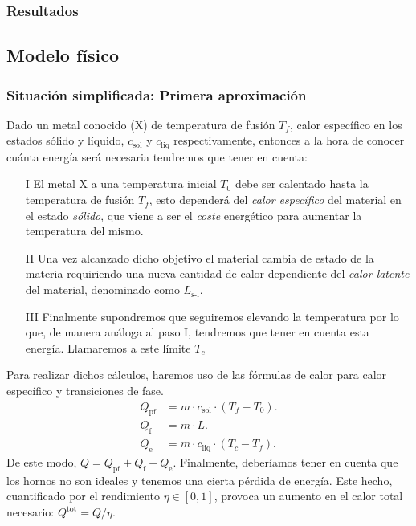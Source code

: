 \subsubsection{Resultados}
%
%
%

%
\subsection{Modelo físico}
%
%
\subsubsection{Situación simplificada: Primera aproximación} \label{PrimeraAproximacion}
%
%
%
Dado un metal conocido (X) de temperatura de fusión $T_f$, calor específico en los estados sólido y líquido, $c_{\text{sol}}$ y $c_{\text{liq}}$ respectivamente, entonces a la hora de conocer cuánta energía será necesaria tendremos que tener en cuenta:
\begin{itemize}
    \item[I] El metal X a una temperatura inicial $T_0$ debe ser calentado hasta la temperatura de fusión $T_f$, esto dependerá del \textit{calor específico} del material en el estado \textit{sólido}, que viene a ser el \textit{coste} energético para aumentar la temperatura del mismo.
    \item[II] Una vez alcanzado dicho objetivo el material cambia de estado de la materia requiriendo una nueva cantidad de calor dependiente del \textit{calor latente} del material, denominado como $L_{\text{s-l}}$.
    \item[III] Finalmente supondremos que seguiremos elevando la temperatura por lo que, de manera análoga al paso I, tendremos que tener en cuenta esta energía. Llamaremos a este límite $T_c$
\end{itemize}
Para realizar dichos cálculos, haremos uso de las fórmulas de calor para calor específico y transiciones de fase.
\begin{align}
    Q_{\text{pf}} &= m \cdot c_{\text{sol}} \cdot (T_f-T_0).\\
    Q_{\text{f}} &= m \cdot L.\\
    Q_{\text{e}} &= m \cdot c_{\text{liq}} \cdot (T_c-T_f).
\end{align}
De este modo, $Q = Q_{\text{pf}} + Q_{\text{f}} + Q_{\text{e}}$. Finalmente, deberíamos tener en cuenta que los hornos no son ideales y tenemos una cierta pérdida de energía. Este hecho, cuantificado por el rendimiento $\eta \in [0,1]$, provoca un aumento en el calor total necesario: $Q^{\text{tot}} = Q/\eta$.

